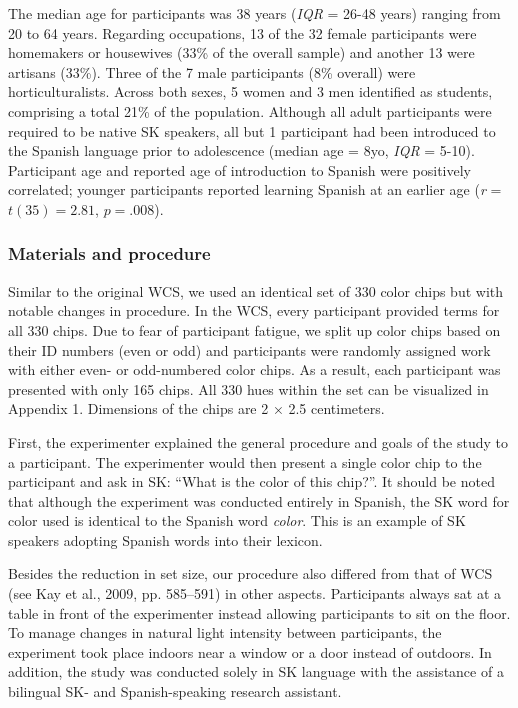 \documentclass[
  english,
  ,man,floatsintext]{apa6}
\begin{document}
The median age for participants was 38 years (\emph{IQR} = 26-48 years) ranging from 20 to 64 years. Regarding occupations, 13 of the 32 female participants were homemakers or housewives (33\% of the overall sample) and another 13 were artisans (33\%). Three of the 7 male participants (8\% overall) were horticulturalists. Across both sexes, 5 women and 3 men identified as students, comprising a total 21\% of the population. Although all adult participants were required to be native SK speakers, all but 1 participant had been introduced to the Spanish language prior to adolescence (median age = 8yo, \emph{IQR} = 5-10). Participant age and reported age of introduction to Spanish were positively correlated; younger participants reported learning Spanish at an earlier age (\emph{r} = \(t(35) = 2.81\), \(p = .008\)).

\hypertarget{materials-and-procedure}{%
\subsubsection{Materials and procedure}\label{materials-and-procedure}}

Similar to the original WCS, we used an identical set of 330 color chips but with notable changes in procedure. In the WCS, every participant provided terms for all 330 chips. Due to fear of participant fatigue, we split up color chips based on their ID numbers (even or odd) and participants were randomly assigned work with either even- or odd-numbered color chips. As a result, each participant was presented with only 165 chips. All 330 hues within the set can be visualized in Appendix 1. Dimensions of the chips are 2 × 2.5 centimeters.

First, the experimenter explained the general procedure and goals of the study to a participant. The experimenter would then present a single color chip to the participant and ask in SK: \enquote{What is the color of this chip?}. It should be noted that although the experiment was conducted entirely in Spanish, the SK word for color used is identical to the Spanish word \emph{color}. This is an example of SK speakers adopting Spanish words into their lexicon.

Besides the reduction in set size, our procedure also differed from that of WCS (see Kay et al., 2009, pp. 585--591) in other aspects. Participants always sat at a table in front of the experimenter instead allowing participants to sit on the floor. To manage changes in natural light intensity between participants, the experiment took place indoors near a window or a door instead of outdoors. In addition, the study was conducted solely in SK language with the assistance of a bilingual SK- and Spanish-speaking research assistant.
\end{document}
